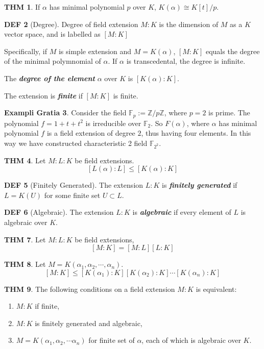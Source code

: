 \documentclass[twocolumn]{article}
\renewcommand{\emph}[1]{\textbf{\textit{#1}}}
\newcommand{\Z}{\mathbb{Z}}
\newcommand{\F}{\mathbb{F}}
\theoremstyle{definition}
\newtheorem{thm}{THM}
\newtheorem{example}[thm]{Exampli Gratia}
\newtheorem{defi}[thm]{DEF}
\theoremstyle{remark}
\begin{document}
\begin{thm}
	If $\alpha$ has minimal polynomial $p$ over $K$, $K(\alpha) \cong K[t]/p$.
\end{thm}

\begin{defi}[Degree]
	Degree of field extension $M : K$ is the dimension of $M$ as a $K$ vector space, and is labelled as $[M : K]$

	Specifically, if $M$ is simple extension and $ M = K(\alpha)$, $[M : K]$ equals the degree of the minimal polymnomial of $\alpha$.
	If $\alpha$ is transcedental, the degree is infinite.

	The \emph{degree of the element} $\alpha$ over $K$ is $[K(\alpha): K]$.

	The extension is \emph{finite} if $[M : K]$ is finite.
\end{defi}

\begin{example}
	Consider the field $\F_p := \Z / p\Z$, where $p = 2$ is prime.
	The polynomial $f=1 + t + t^2$ is irreducible over $\F_2$. 
	So $F(\alpha)$, where $\alpha$ has minimal polynomial $f$ is a field extension of degree $2$, thus having four elements. 
	In this way we have constructed characteristic 2 field $\F_{2^2}$.
\end{example}

\begin{thm}
	Let $M : L : K$ be field extensions. 
	$$[L(\alpha): L] \leq[ K(\alpha) : K]$$
\end{thm}

\begin{defi}[Finitely Generated]
	The extension $L:K$ is \emph{finitely generated} if $L = K(U)$ for some finite set $U \subset L$.
\end{defi}

\begin{defi}[Algebraic]
	The extension $L:K$ is \emph{algebraic} if every element of $L$ is algebraic over $K$.
\end{defi}

\begin{thm}
	Let $M:L:K$ be field extensions,
	$$[M:K] = [M:L][L:K]$$
\end{thm}

\begin{thm}
	Let $M = K(\alpha_1, \alpha_2, \cdots, \alpha_n)$.
	$$[M:K] \leq [K(\alpha_1):K][K(\alpha_2):K] \cdots[K(\alpha_n):K]$$
\end{thm}

\begin{thm}
	The following conditions on a field extension $M:K$ is equivalent:
	\begin{enumerate}
		\item $M:K$ if finite,
		\item $M:K$ is finitely generated and algebraic,
		\item $M = K(\alpha_1, \alpha_2, \cdots \alpha_n)$ for finite set of $\alpha$, each of which is algebraic over $K$.
	\end{enumerate}
\end{thm}
\end{document}
